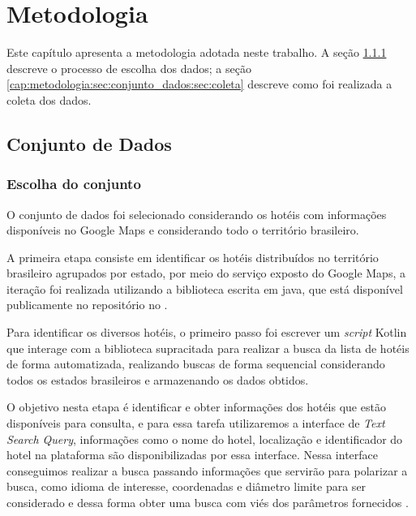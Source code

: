 \chapter{Metodologia}
\label{cap:metodologia}

Este capítulo apresenta a metodologia adotada neste trabalho. A seção \ref{cap:metodologia:sec:conjunto_dados:sec:escolha_conjunto} descreve o processo de escolha dos dados; a seção \ref{cap:metodologia:sec:conjunto_dados:sec:coleta} descreve como foi realizada a coleta dos dados.


\section{Conjunto de Dados}
\label{cap:metodologia:sec:conjunto_dados}

\subsection{Escolha do conjunto}
\label{cap:metodologia:sec:conjunto_dados:sec:escolha_conjunto}

O conjunto de dados foi selecionado considerando os hotéis com informações disponíveis no Google Maps e considerando todo o território brasileiro.

A primeira etapa consiste em identificar os hotéis distribuídos no território brasileiro agrupados por estado, por meio do serviço exposto do Google Maps, a iteração foi realizada utilizando a biblioteca escrita em java,  que está disponível publicamente no repositório no .

Para identificar os diversos hotéis, o primeiro passo foi escrever um \emph{script} Kotlin  que interage com a biblioteca supracitada para realizar a busca da lista de hotéis de forma automatizada, realizando buscas de forma sequencial considerando todos os estados brasileiros e armazenando os dados obtidos.

O objetivo nesta etapa é identificar e obter informações dos hotéis que estão disponíveis para consulta, e para essa tarefa utilizaremos a interface de \emph{Text Search Query}, informações como o nome do hotel, localização e identificador do hotel na plataforma são disponibilizadas por essa interface. Nessa interface conseguimos realizar a busca passando informações que servirão para polarizar a busca, como idioma de interesse, coordenadas e diâmetro limite para ser considerado e dessa forma obter uma busca com viés dos parâmetros fornecidos \cite{placesSearchText2023}.

